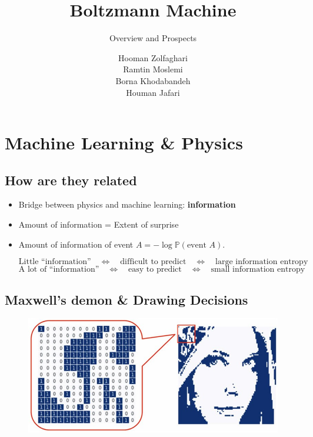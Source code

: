 \documentclass{antclass}
\title{Boltzmann Machine}
\subtitle{Overview and Prospects}
\author{Hooman Zolfaghari \\ Ramtin Moslemi \\ Borna Khodabandeh \\ Houman Jafari}
\begin{document}
\maketitle
\chapter{Machine Learning \& Physics}

\section{How are they related}
\begin{itemize}
	\item Bridge between physics and machine learning:
	\textbf{information}
	\item Amount of information = Extent of surprise
	\item Amount of information of event \( A = - \log \mathbb{P}(\text{event }A) \).

	\[
	\text{Little ``information''} \quad \Leftrightarrow \quad \text{difficult to predict} \quad \Leftrightarrow \quad \text{large information entropy}
	\]
	\[
	\text{A lot of ``information''} \quad \Leftrightarrow \quad \text{easy to predict} \quad \Leftrightarrow \quad \text{small information entropy}
	\]
	
	
\end{itemize}

\section{Maxwell’s demon \& Drawing Decisions}

  \begin{figure}[ht]
	\centering
	\includegraphics[width=0.8\linewidth]{pics/MLandPhysics/drawing.jpg}
	\label{fig:drawing}
\end{figure}
\end{document}
